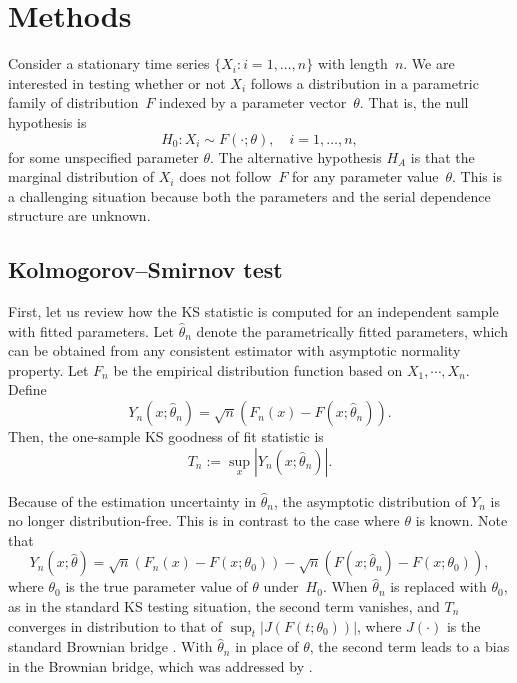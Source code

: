 \documentclass[12pt]{article}
\begin{document}
\section{Methods}\label{sec:methods}

Consider a stationary time series $\{X_i: i = 1, \ldots, n\}$ with length~$n$.
We are interested in testing whether or not $X_i$ follows a distribution in a
parametric family of distribution~$F$ indexed by a parameter
vector~$\theta$. That is, the null hypothesis is
\[
  H_0: X_i \sim F(\cdot ; \theta), \quad i = 1, \ldots, n,
\]
for some unspecified parameter $\theta$.
The alternative hypothesis $H_A$ is that the marginal distribution of $X_i$ does
not follow~$F$ for any parameter value~$\theta$. This is a challenging situation
because both the parameters and the serial dependence structure are unknown.

\subsection{Kolmogorov--Smirnov test}

First, let us review how the KS statistic is computed for an independent
sample with fitted parameters. Let $\hat\theta_n$ denote the parametrically
fitted parameters, which can be obtained from any consistent estimator with
asymptotic normality property.  Let $F_n$ be the empirical distribution
function based on $X_1, \cdots ,X_n$.
Define
\begin{equation*}
Y_n(x; \hat\theta_n) = \sqrt{n}(F_n(x) - F(x; \hat\theta_n)).
\end{equation*}
Then, the one-sample KS goodness of fit statistic is
\begin{equation*}
T_n := \sup_x|Y_n(x; \hat\theta_n)|.
\end{equation*}


Because of the estimation uncertainty in $\hat\theta_n$, the asymptotic
distribution of $Y_n$ is no longer distribution-free. This is in contrast to the
case where $\theta$ is known.  Note that
\begin{equation*}
Y_n(x; \hat\theta) = \sqrt{n}(F_n(x) - F(x; \theta_0)) -
\sqrt{n}(F(x; \hat\theta_n) - F(x; \theta_0)),
\end{equation*}
where $\theta_0$ is the true parameter value of $\theta$ under~$H_0$.
When $\hat\theta_n$ is replaced with $\theta_0$, as in the standard KS testing
situation, the second term vanishes, and $T_n$ converges in distribution to that
of $\sup_t | J(F(t; \theta_0)) |$, where $J(\cdot)$ is the standard Brownian bridge
\citep{kolmogorov1933sulla}. With $\hat\theta_n$ in place of $\theta$, the
second term leads to a bias in the Brownian bridge, which was addressed by
\citet{babu2004goodness}.
\end{document}
